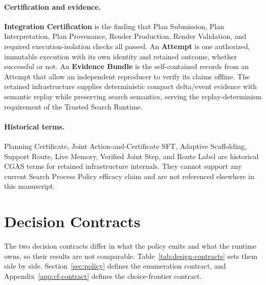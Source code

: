 \paragraph{Certification and evidence.}
\textbf{Integration Certification} is the finding that Plan Submission, Plan Interpretation, Plan Provenance, Render Production, Render Validation, and required execution-isolation checks all passed. An \textbf{Attempt} is one authorized, immutable execution with its own identity and retained outcome, whether successful or not. An \textbf{Evidence Bundle} is the self-contained records from an Attempt that allow an independent reproducer to verify its claims offline. The retained infrastructure supplies deterministic compact delta/event evidence with semantic replay while preserving search semantics, serving the replay-determinism requirement of the Trusted Search Runtime.

\paragraph{Historical terms.}
Planning Certificate, Joint Action-and-Certificate SFT, Adaptive Scaffolding, Support Route, Live Memory, Verified Joint Step, and Route Label are historical CGAS terms for retained infrastructure internals. They cannot support any current Search Process Policy efficacy claim and are not referenced elsewhere in this manuscript.


\section{Decision Contracts}
\label{app:design-contracts}

The two decision contracts differ in what the policy emits and what the runtime owns, so their results are not comparable. Table~\ref{tab:design-contracts} sets them side by side. Section~\ref{sec:policy} defines the enumeration contract, and Appendix~\ref{app:cf-contract} defines the choice-frontier contract.

